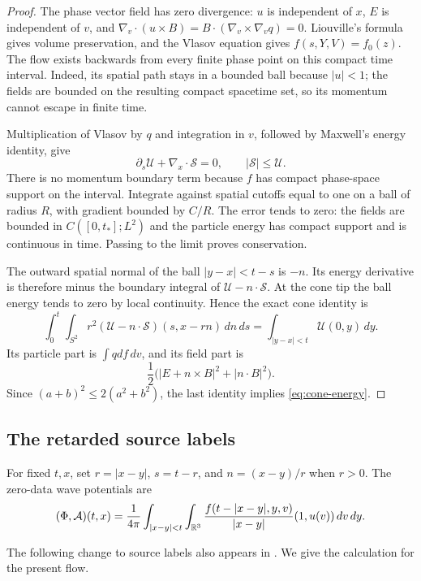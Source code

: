\begin{proof}
The phase vector field has zero divergence: $u$ is independent of $x$,
$E$ is independent of $v$, and
$\nabla_v\cdot(u\times B)=B\cdot(\nabla_v\times\nabla_v q)=0$.
Liouville's formula gives volume preservation, and the Vlasov equation
gives $f(s,Y,V)=f_0(z)$. The flow exists backwards from every finite
phase point on this compact time interval. Indeed, its spatial path
stays in a bounded ball because $|u|<1$; the fields are bounded on the
resulting compact spacetime set, so its momentum cannot escape in
finite time.

Multiplication of Vlasov by $q$ and integration in $v$, followed by
Maxwell's energy identity, give
\[
 \partial_s\mathcal U+\nabla_x\cdot\mathcal S=0,
 \qquad |\mathcal S|\leq\mathcal U.
\]
There is no momentum boundary term because $f$ has compact phase-space
support on the interval. Integrate against spatial cutoffs equal to one
on a ball of radius $R$, with gradient bounded by $C/R$. The error tends
to zero: the fields are bounded in $C([0,t_*];L^2)$ and the particle
energy has compact support and is continuous in time. Passing to the
limit proves conservation.

The outward spatial normal of the ball $|y-x|<t-s$ is $-n$. Its energy
derivative is therefore minus the boundary integral of
$\mathcal U-n\cdot\mathcal S$. At the cone tip the ball energy tends
to zero by local continuity. Hence the exact cone identity is
\[
 \int_0^t\int_{S^2}r^2
   (\mathcal U-n\cdot\mathcal S)(s,x-rn)\,dn\,ds
 =\int_{|y-x|<t}\mathcal U(0,y)\,dy.
\]
Its particle part is $\int qd f\,dv$, and its field part is
\[
 \frac12\bigl(|E+n\times B|^2+|n\cdot B|^2\bigr).
\]
Since $(a+b)^2\leq2(a^2+b^2)$, the last identity implies
\eqref{eq:cone-energy}.
\end{proof}

\subsection{The retarded source labels}

For fixed $t,x$, set $r=|x-y|$, $s=t-r$, and $n=(x-y)/r$ when $r>0$.
The zero-data wave potentials are
\begin{equation}\label{ret:potentials}
 (\Phi,\mathcal A)(t,x)=\frac1{4\pi}
  \int_{|x-y|<t}\int_{\mathbb R^3}
       \frac{f(t-|x-y|,y,v)}{|x-y|}(1,u(v))\,dv\,dy.
\end{equation}

The following change to source labels also appears in
\cite[Section~9, Lemma~9.2]{Lazarovici2016}. We give the calculation
for the present flow.

